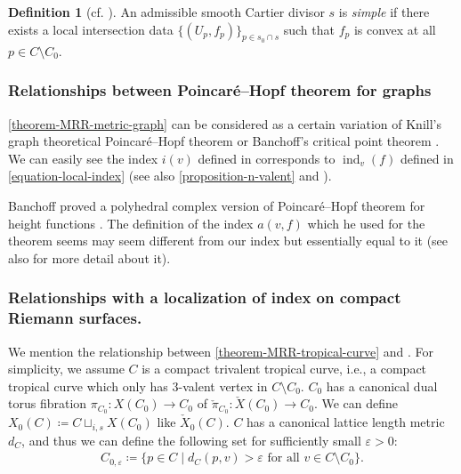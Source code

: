 \documentclass[a4paper,dvipdfmx,reqno,12pt]{amsart}
\theoremstyle{definition}
\newtheorem{definition}[theorem]{Definition}
\newcommand{\deq}{\coloneqq}
\newcommand{\vep}{\varepsilon}%
\newcommand{\opn}[1]{\operatorname{#1}}
\numberwithin{equation}{section}
\begin{document}
\begin{definition}[{cf. \cite{auroux2022lagrangian}}]
An admissible smooth Cartier divisor $s$ is 
\emph{simple} if there exists a local intersection data
$\{(U_p,f_p)\}_{p\in s_0\cap s}$ such that
$f_p$ is convex at all $p\in C\setminus C_0$.
\end{definition}

\subsubsection{Relationships between 
Poincar\'e--Hopf theorem for graphs}

\cref{theorem-MRR-metric-graph} can be considered 
as a certain variation of Knill's graph 
theoretical Poincar\'e--Hopf theorem \cite{knill2012graph}
or 
Banchoff's critical point theorem \cite{MR225327}.
We can easily see the index $i(v)$ defined in 
\cite[3]{knill2012graph}
corresponds to $\opn{ind}_v(f)$ defined in 
\cref{equation-local-index} (see also 
\cref{proposition-n-valent} and \cite[7]{knill2012graph}).

Banchoff proved a polyhedral complex version of Poincar\'e--Hopf theorem
for height functions \cite[Theorem 1]{MR225327}.
The definition of the index $a(v,f)$ 
\cite[p.246]{MR225327} which 
he used for the theorem seems may seem different 
from our index but essentially equal to it
(see also \cite[p.143-144]{grunert2017piecewise} 
for more detail about it).





\subsubsection{Relationships with a localization of 
index on compact Riemann surfaces.}

We mention the relationship between 
\cref{theorem-MRR-tropical-curve} and
\cite[6]{MR2676658}.
For simplicity,
we assume $C$ is a compact trivalent tropical curve, i.e.,
a compact tropical curve which only has $3$-valent
vertex in $C\setminus C_0$.  
$C_0$ has a canonical dual torus fibration 
$\pi_{C_0}\colon X(C_0)\to C_0$ of
$\check{\pi}_{C_0} \colon \check{X}(C_0)\to C_0$.
We can define $X_0(C)\deq C\sqcup_{i,s} X(C_0)$ like
$\check{X}_0(C)$.
$C$ has a canonical lattice length metric $d_{C}$, and
thus we can define the following set for sufficiently small
$\vep >0$: 
\begin{align}
C_{0,\vep}\deq \{p\in C\mid d_C(p,v)>\vep 
\text{ for all } v\in C\setminus C_0\}.
\end{align}
\end{document}
